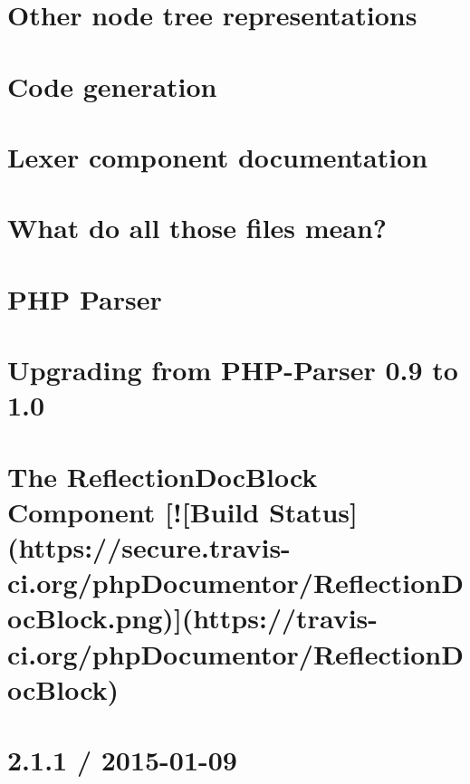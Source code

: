 \documentclass[twoside]{book}
\newcommand{\+}{\discretionary{\mbox{\scriptsize$\hookleftarrow$}}{}{}}
\begin{document}
\chapter{Other node tree representations}
\label{md_vendor_nikic_php-parser_doc_3__other_node_tree_representations}

\chapter{Code generation}
\label{md_vendor_nikic_php-parser_doc_4__code_generation}

\chapter{Lexer component documentation}
\label{md_vendor_nikic_php-parser_doc_component__lexer}

\chapter{What do all those files mean?}
\label{md_vendor_nikic_php-parser_grammar__r_e_a_d_m_e}

\chapter{P\+H\+P Parser}
\label{md_vendor_nikic_php-parser__r_e_a_d_m_e}

\chapter{Upgrading from P\+H\+P-\/\+Parser 0.9 to 1.0}
\label{md_vendor_nikic_php-parser__u_p_g_r_a_d_e-1_80}

\chapter{The Reflection\+Doc\+Block Component [![Build Status](https\+://secure.travis-\/ci.org/php\+Documentor/\+Reflection\+Doc\+Block.png)](https\+://travis-\/ci.org/php\+Documentor/\+Reflection\+Doc\+Block)}
\label{md_vendor_phpdocumentor_reflection-docblock__r_e_a_d_m_e}

\chapter{2.1.1 / 2015-\/01-\/09}
\label{md_vendor_phpspec_phpspec__c_h_a_n_g_e_s}

\end{document}
